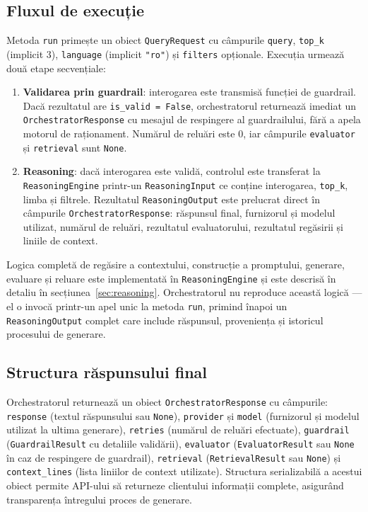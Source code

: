 \documentclass[12pt, a4paper, oneside, romanian]{teza-upb}
\begin{document}
\subsection{Fluxul de execuție}

Metoda \texttt{run} primește un obiect \texttt{QueryRequest} cu câmpurile \texttt{query}, \texttt{top\_k} (implicit 3), \texttt{language} (implicit \texttt{"ro"}) și \texttt{filters} opționale. Execuția urmează două etape secvențiale:

\begin{enumerate}
    \item \textbf{Validarea prin guardrail}: interogarea este transmisă funcției de guardrail. Dacă rezultatul are \texttt{is\_valid = False}, orchestratorul returnează imediat un \texttt{OrchestratorResponse} cu mesajul de respingere al guardrailului, fără a apela motorul de raționament. Numărul de reluări este 0, iar câmpurile \texttt{evaluator} și \texttt{retrieval} sunt \texttt{None}.
    \item \textbf{Reasoning}: dacă interogarea este validă, controlul este transferat la  \texttt{ReasoningEngine} printr-un \texttt{ReasoningInput} ce conține interogarea, \texttt{top\_k}, limba și filtrele. Rezultatul \texttt{ReasoningOutput} este prelucrat direct în câmpurile \texttt{OrchestratorResponse}: răspunsul final, furnizorul și modelul utilizat, numărul de reluări, rezultatul evaluatorului, rezultatul regăsirii și liniile de context.
\end{enumerate}

Logica completă de regăsire a contextului, construcție a promptului, generare, evaluare și reluare este implementată în \texttt{ReasoningEngine} și este descrisă în detaliu în secțiunea~\ref{sec:reasoning}. Orchestratorul nu reproduce această logică — el o invocă printr-un apel unic la metoda \texttt{run}, primind înapoi un \texttt{ReasoningOutput} complet care include răspunsul, proveniența și istoricul procesului de generare.

\subsection{Structura răspunsului final}

Orchestratorul returnează un obiect \texttt{OrchestratorResponse} cu câmpurile: \texttt{response} (textul răspunsului sau \texttt{None}), \texttt{provider} și \texttt{model} (furnizorul și modelul utilizat la ultima generare), \texttt{retries} (numărul de reluări efectuate), \texttt{guardrail} (\texttt{GuardrailResult} cu detaliile validării), \texttt{evaluator} (\texttt{EvaluatorResult} sau \texttt{None} în caz de respingere de guardrail), \texttt{retrieval} (\texttt{RetrievalResult} sau \texttt{None}) și \texttt{context\_lines} (lista liniilor de context utilizate). Structura serializabilă a acestui obiect permite API-ului să returneze clientului informații complete, asigurând transparența întregului proces de generare.
\end{document}
